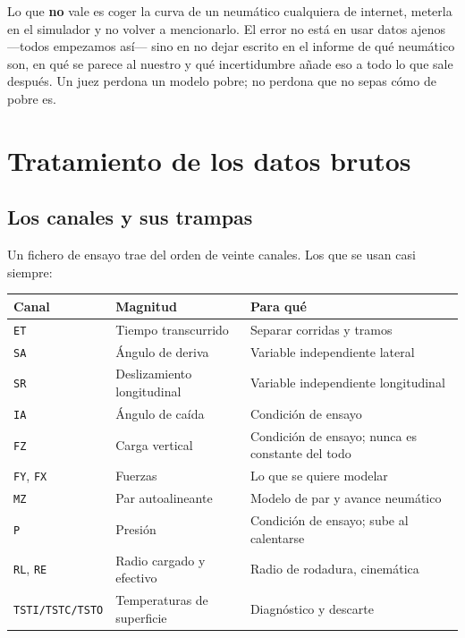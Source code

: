 \begin{ojo}
Lo que \textbf{no} vale es coger la curva de un neumático cualquiera de internet,
meterla en el simulador y no volver a mencionarlo. El error no está en usar datos
ajenos ---todos empezamos así--- sino en no dejar escrito en el informe de qué
neumático son, en qué se parece al nuestro y qué incertidumbre añade eso a todo
lo que sale después. Un juez perdona un modelo pobre; no perdona que no sepas
cómo de pobre es.
\end{ojo}

\section{Tratamiento de los datos brutos}
\label{sec:modelado_neumatico:02}

\subsection{Los canales y sus trampas}

Un fichero de ensayo trae del orden de veinte canales. Los que se usan casi
siempre:

\begin{center}
\begin{tabularx}{\textwidth}{@{}llX@{}}
\toprule
\textbf{Canal} & \textbf{Magnitud} & \textbf{Para qué} \\
\midrule
\texttt{ET} & Tiempo transcurrido & Separar corridas y tramos \\
\texttt{SA} & Ángulo de deriva & Variable independiente lateral \\
\texttt{SR} & Deslizamiento longitudinal & Variable independiente longitudinal \\
\texttt{IA} & Ángulo de caída & Condición de ensayo \\
\texttt{FZ} & Carga vertical & Condición de ensayo; nunca es constante del todo \\
\texttt{FY}, \texttt{FX} & Fuerzas & Lo que se quiere modelar \\
\texttt{MZ} & Par autoalineante & Modelo de par y avance neumático \\
\texttt{P} & Presión & Condición de ensayo; sube al calentarse \\
\texttt{RL}, \texttt{RE} & Radio cargado y efectivo & Radio de rodadura, cinemática \\
\texttt{TSTI/TSTC/TSTO} & Temperaturas de superficie & Diagnóstico y descarte \\
\bottomrule
\end{tabularx}
\end{center}


